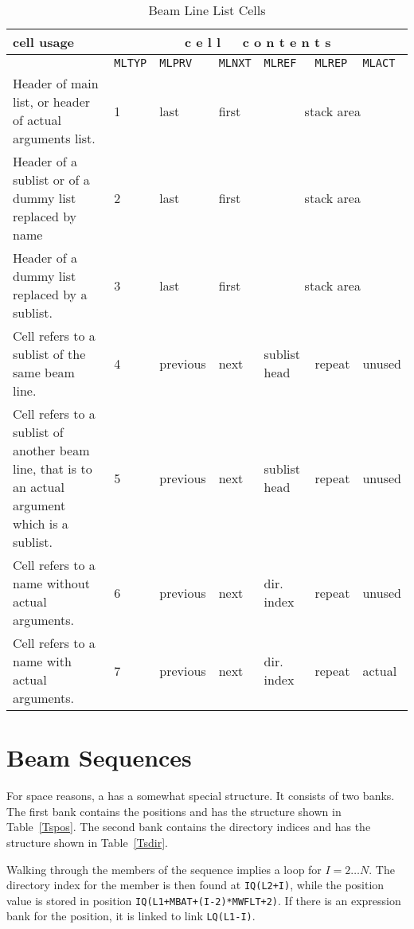 \begin{table}[h]
\caption{Beam Line List Cells}
\label{Tcell}
\centering
\vspace{1ex}
\begin{tabular}{|p{}|l|l|l|l|l|l|}
\hline
cell usage &\multicolumn{6}{c|}{c e l l\ \ \ c o n t e n t s}\\
\hline
      &\tt MLTYP&\tt MLPRV&\tt MLNXT&\tt MLREF&\tt MLREP&\tt MLACT\\
\hline
Header of main list, or header of actual arguments list.
  &1 &last  &first &\multicolumn{3}{c|}{stack area}\\
\hline
Header of a sublist or of a dummy list replaced by name
  &2 &last  &first &\multicolumn{3}{c|}{stack area}\\
\hline
Header of a dummy list replaced by a sublist.
  &3 &last  &first &\multicolumn{3}{c|}{stack area}\\
\hline
Cell refers to a sublist of the same beam line.
  &4 &previous&next&sublist head&repeat&unused\\
\hline
Cell refers to a sublist of another beam line, that is to an actual
argument which is a sublist.
  &5 &previous&next&sublist head&repeat&unused\\
\hline
Cell refers to a name without actual arguments.
  &6 &previous&next&dir. index&repeat&unused\\
\hline
Cell refers to a name with actual arguments.
  &7 &previous&next&dir. index&repeat&actual\\
\hline
\end{tabular}
\end{table}

\section{Beam Sequences}
For space reasons, a  has a somewhat special structure.
It consists of two banks.
The first bank contains the positions and has the structure shown
in Table~\ref{Tspos}.
The second bank contains the directory indices and has the structure shown
in Table~\ref{Tsdir}.

Walking through the members of the sequence implies a loop for
$I = 2 \ldots N$.
The directory index for the member is then found at {\tt IQ(L2+I)},
while the position value is stored in position
{\tt IQ(L1+MBAT+(I-2)*MWFLT+2)}.
If there is an expression bank for the position,
it is linked to link {\tt LQ(L1-I)}.

